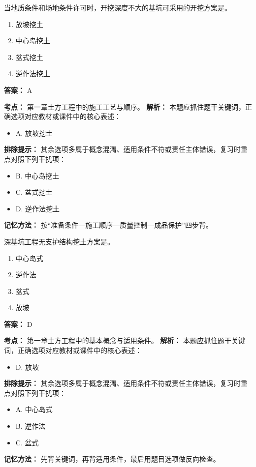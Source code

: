 \documentclass[UTF8,fontset=fandol,11pt]{ctexart}
\begin{document}
\begin{quizbox}[title={第 10 题}]
当地质条件和场地条件许可时，开挖深度不大的基坑可采用的开挖方案是。\\
\begin{enumerate}[label=\Alph*.]
\item 放坡挖土
\item 中心岛挖土
\item 盆式挖土
\item 逆作法挖土
\end{enumerate}
\textbf{答案：} A
\vspace{0.25em}
\begin{answerbox}[title={考点解析}]
\textbf{考点：} 第一章土方工程中的施工工艺与顺序。
\textbf{解析：} 本题应抓住题干关键词，正确选项对应教材或课件中的核心表述：
\begin{itemize}
\item A. 放坡挖土
\end{itemize}
\textbf{排除提示：} 其余选项多属于概念混淆、适用条件不符或责任主体错误，复习时重点对照下列干扰项：
\begin{itemize}
\item B. 中心岛挖土
\item C. 盆式挖土
\item D. 逆作法挖土
\end{itemize}
\textbf{记忆方法：} 按“准备条件—施工顺序—质量控制—成品保护”四步背。
\end{answerbox}
\end{quizbox}

\begin{quizbox}[title={第 11 题}]
深基坑工程无支护结构挖土方案是。\\
\begin{enumerate}[label=\Alph*.]
\item 中心岛式
\item 逆作法
\item 盆式
\item 放坡
\end{enumerate}
\textbf{答案：} D
\vspace{0.25em}
\begin{answerbox}[title={考点解析}]
\textbf{考点：} 第一章土方工程中的基本概念与适用条件。
\textbf{解析：} 本题应抓住题干关键词，正确选项对应教材或课件中的核心表述：
\begin{itemize}
\item D. 放坡
\end{itemize}
\textbf{排除提示：} 其余选项多属于概念混淆、适用条件不符或责任主体错误，复习时重点对照下列干扰项：
\begin{itemize}
\item A. 中心岛式
\item B. 逆作法
\item C. 盆式
\end{itemize}
\textbf{记忆方法：} 先背关键词，再背适用条件，最后用题目选项做反向检查。
\end{answerbox}
\end{quizbox}
\end{document}
